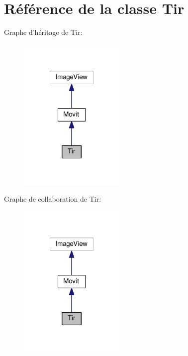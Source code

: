 \hypertarget{class_tir}{\section{Référence de la classe Tir}
\label{class_tir}
}


Graphe d'héritage de Tir\-:
\nopagebreak
\begin{figure}[H]
\begin{center}
\leavevmode
\includegraphics[width=144pt]{class_tir__inherit__graph}
\end{center}
\end{figure}


Graphe de collaboration de Tir\-:
\nopagebreak
\begin{figure}[H]
\begin{center}
\leavevmode
\includegraphics[width=144pt]{class_tir__coll__graph}
\end{center}
\end{figure}
